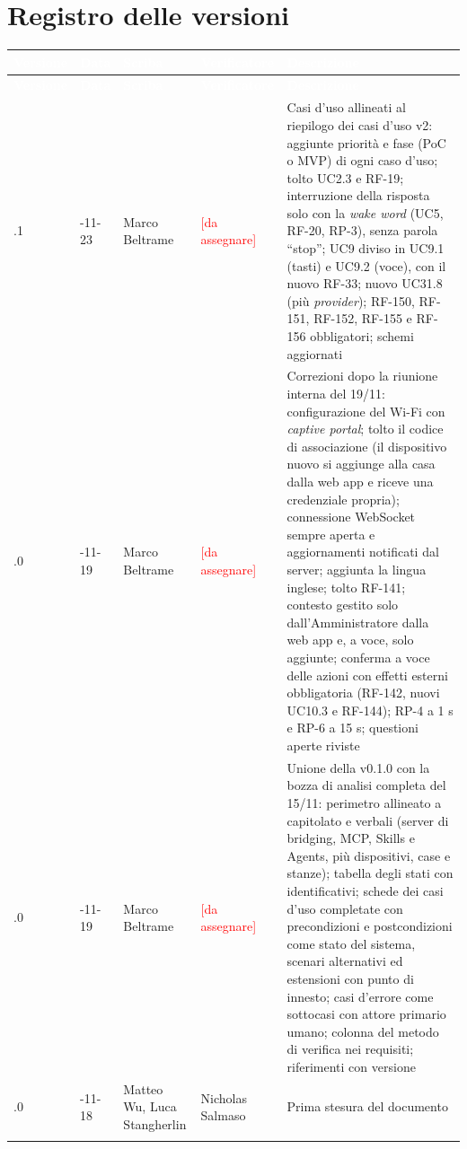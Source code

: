 \documentclass[12pt,a4paper]{article}
\newcommand{\ph}[1]{\textcolor{red}{[#1]}}
\newcommand{\thc}[1]{\textcolor{white}{\textbf{#1}}}
\newcommand{\rl}{\\ \arrayrulecolor{bfline}\hline}
\begin{document}
\section{Registro delle versioni}

\begin{longtable}{>{\raggedright\arraybackslash}p{}>{\raggedright\arraybackslash}p{}>{\raggedright\arraybackslash}p{}>{\raggedright\arraybackslash}p{}>{\raggedright\arraybackslash}p{}}
\rowcolor{bfblue}\thc{Versione} & \thc{Data} & \thc{Scriba} & \thc{Verificatore} & \thc{Descrizione} \\
\endfirsthead
\rowcolor{bfblue}\thc{Versione} & \thc{Data} & \thc{Scriba} & \thc{Verificatore} & \thc{Descrizione} \\
\endhead
0.3.1 & 2026-11-23 & Marco Beltrame & \ph{da assegnare} & Casi d'uso allineati al riepilogo dei casi d'uso v2: aggiunte priorità e fase (PoC o MVP) di ogni caso d'uso; tolto UC2.3 e RF-19; interruzione della risposta solo con la \emph{wake word} (UC5, RF-20, RP-3), senza parola ``stop''; UC9 diviso in UC9.1 (tasti) e UC9.2 (voce), con il nuovo RF-33; nuovo UC31.8 (più \emph{provider}); RF-150, RF-151, RF-152, RF-155 e RF-156 obbligatori; schemi aggiornati \rl
0.3.0 & 2026-11-19 & Marco Beltrame & \ph{da assegnare} & Correzioni dopo la riunione interna del 19/11: configurazione del Wi-Fi con \emph{captive portal}; tolto il codice di associazione (il dispositivo nuovo si aggiunge alla casa dalla web app e riceve una credenziale propria); connessione WebSocket sempre aperta e aggiornamenti notificati dal server; aggiunta la lingua inglese; tolto RF-141; contesto gestito solo dall'Amministratore dalla web app e, a voce, solo aggiunte; conferma a voce delle azioni con effetti esterni obbligatoria (RF-142, nuovi UC10.3 e RF-144); RP-4 a 1 s e RP-6 a 15 s; questioni aperte riviste \rl
0.2.0 & 2026-11-19 & Marco Beltrame & \ph{da assegnare} & Unione della v0.1.0 con la bozza di analisi completa del 15/11: perimetro allineato a capitolato e verbali (server di bridging, MCP, Skills e Agents, più dispositivi, case e stanze); tabella degli stati con identificativi; schede dei casi d'uso completate con precondizioni e postcondizioni come stato del sistema, scenari alternativi ed estensioni con punto di innesto; casi d'errore come sottocasi con attore primario umano; colonna del metodo di verifica nei requisiti; riferimenti con versione \rl
0.1.0 & 2026-11-18 & Matteo Wu, Luca Stangherlin & Nicholas Salmaso & Prima stesura del documento \rl
\end{longtable}
\end{document}
